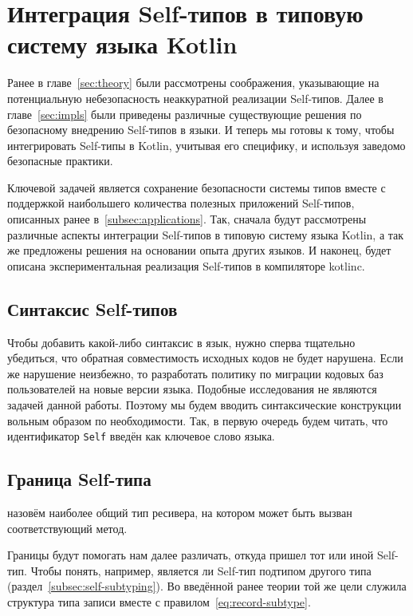 \section{Интеграция Self-типов в типовую систему языка Kotlin} \label{sec:integration}

Ранее в главе~\ref{sec:theory} были рассмотрены соображения, указывающие на потенциальную небезопасность неаккуратной реализации Self-типов.
Далее в главе~\ref{sec:impls} были приведены различные существующие решения по безопасному внедрению Self-типов в языки.
И теперь мы готовы к тому, чтобы интегрировать Self-типы в Kotlin, учитывая его специфику, и используя заведомо безопасные практики.

Ключевой задачей является сохранение безопасности системы типов вместе с поддержкой наибольшего количества полезных приложений Self-типов, описанных ранее в~\ref{subsec:applications}.
Так, сначала будут рассмотрены различные аспекты интеграции Self-типов в типовую систему языка Kotlin, а так же предложены решения на основании опыта других языков.
И наконец, будет описана экспериментальная реализация Self-типов в компиляторе kotlinc.


\subsection{Синтаксис Self-типов}

Чтобы добавить какой-либо синтаксис в язык, нужно сперва тщательно убедиться, что обратная совместимость исходных кодов не будет нарушена.
Если же нарушение неизбежно, то разработать политику по миграции кодовых баз пользователей на новые версии языка.
Подобные исследования не являются задачей данной работы.
Поэтому мы будем вводить синтаксические конструкции вольным образом по необходимости.
Так, в первую очередь будем читать, что идентификатор \texttt{Self} введён как ключевое слово языка.


\subsection{Граница Self-типа} \label{subsec:bound}

\begin{definition}
    \label{def:bound}
     назовём наиболее общий тип ресивера, на котором может быть вызван соответствующий метод.
\end{definition}

Границы будут помогать нам далее различать, откуда пришел тот или иной Self-тип.
Чтобы понять, например, является ли Self-тип подтипом другого типа (раздел~\ref{subsec:self-subtyping}).
Во введённой ранее теории той же цели служила структура типа записи вместе с правилом~\eqref{eq:record-subtype}.

